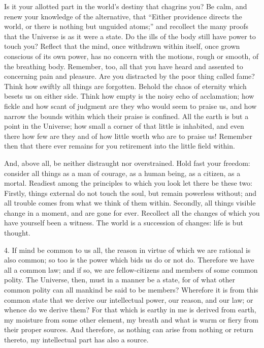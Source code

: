 \documentclass{book}
\begin{document}
Is it your allotted part in the world's destiny that chagrins you?
Be calm, and renew your knowledge of the alternative, that ``Either
providence directs the world, or there is nothing but unguided atoms;''
and recollect the many proofs that the Universe is as it were a state.
Do the ills of the body still have power to touch you? Reflect that
the mind, once withdrawn within itself, once grown conscious of its
own power, has no concern with the motions, rough or smooth, of the
breathing body. Remember, too, all that you have heard and assented
to concerning pain and pleasure. Are you distracted by the poor thing
called fame? Think how swiftly all things are forgotten. Behold the
chaos of eternity which besets us on either side. Think how empty is
the noisy echo of acclamation; how fickle and how scant of judgment are
they who would seem to praise us, and how narrow the bounds within which
their praise is confined. All the earth is but a point in the Universe;
how small a corner of that little is inhabited, and even there how few
are they and of how little worth who are to praise us! Remember then
that there ever remains for you retirement into the little field within.

And, above all, be neither distraught nor overstrained. Hold fast your
freedom: consider all things as a man of courage, as a human being, as
a citizen, as a mortal. Readiest among the principles to which you look
let there be these two: Firstly, things external do not touch the soul,
but remain powerless without; and all trouble comes from what we think
of them within. Secondly, all things visible change in a moment, and are
gone for ever. Recollect all the changes of which you have yourself been
a witness. The world is a succession of changes: life is but thought.

4. If mind be common to us all, the reason in virtue of which we are
rational is also common; so too is the power which bids us do or not
do. Therefore we have all a common law; and if so, we are
fellow-citizens and members of some common polity. The Universe, then,
must in a manner be a state, for of what other common polity can all
mankind be said to be members? Wherefore it is from this common state
that we derive our intellectual power, our reason, and our law; or
whence do we derive them? For that which is earthy in me is derived
from earth, my moisture from some other element, my breath and what is
warm or fiery from their proper sources. And therefore, as nothing can
arise from nothing or return thereto, my intellectual part has also a
source.
\end{document}
